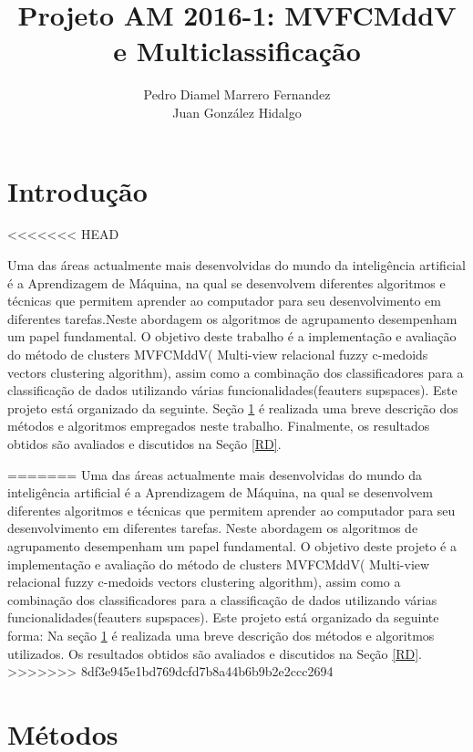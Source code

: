 \documentclass[12pt]{article}
\author{Pedro Diamel Marrero Fernandez \\ Juan González Hidalgo}
\title{Projeto AM 2016-1: MVFCMddV e Multiclassificação}
\begin{document}
\maketitle



\section*{Introdução}
<<<<<<< HEAD

Uma das áreas actualmente mais desenvolvidas do mundo da inteligência artificial é a Aprendizagem de Máquina, na qual se desenvolvem diferentes algoritmos e técnicas que permitem aprender ao computador para seu desenvolvimento em diferentes tarefas.Neste abordagem os algoritmos de agrupamento desempenham um papel fundamental. O objetivo deste trabalho é a implementação e avaliação do método de clusters MVFCMddV( Multi-view relacional fuzzy c-medoids vectors clustering algorithm), assim como a combinação dos classificadores para a classificação de dados utilizando várias funcionalidades(feauters supspaces). Este projeto está organizado da seguinte. Seção \ref{MET} é realizada uma breve descrição dos métodos e algoritmos empregados neste trabalho. Finalmente, os resultados obtidos são avaliados e discutidos na Seção \ref{RD}.

=======
Uma das áreas actualmente mais desenvolvidas do mundo da inteligência artificial é a Aprendizagem de Máquina, na qual se desenvolvem diferentes algoritmos e técnicas que permitem aprender ao computador para seu desenvolvimento em diferentes tarefas. Neste abordagem os algoritmos de agrupamento desempenham um papel fundamental. O objetivo deste projeto é a implementação e avaliação do método de clusters MVFCMddV( Multi-view relacional fuzzy c-medoids vectors clustering algorithm), assim como a combinação dos classificadores para a classificação de dados utilizando várias funcionalidades(feauters supspaces). Este projeto está organizado da seguinte forma: Na seção \ref{MET} é realizada uma breve descrição dos métodos e algoritmos utilizados. Os resultados obtidos são avaliados e discutidos na Seção \ref{RD}.
>>>>>>> 8df3e945e1bd769dcfd7b8a44b6b9b2e2ccc2694

\section{Métodos}\label{MET}
\end{document}
